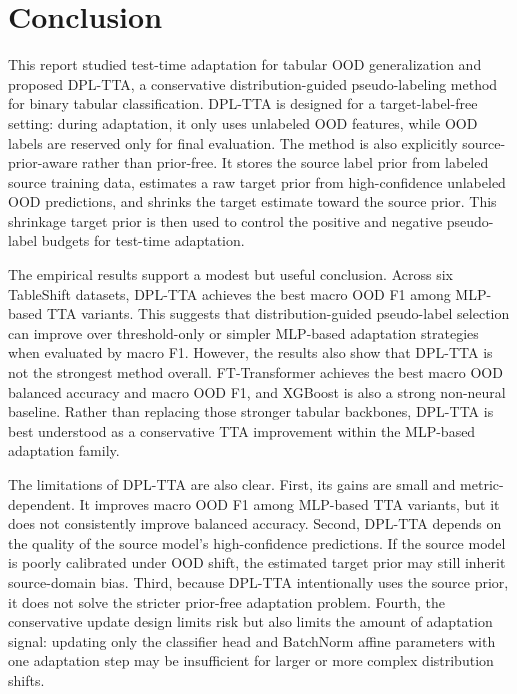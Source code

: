 \documentclass{article}
\begin{document}



\section{Conclusion}

This report studied test-time adaptation for tabular OOD generalization and proposed DPL-TTA, a conservative distribution-guided pseudo-labeling method for binary tabular classification. DPL-TTA is designed for a target-label-free setting: during adaptation, it only uses unlabeled OOD features, while OOD labels are reserved only for final evaluation. The method is also explicitly source-prior-aware rather than prior-free. It stores the source label prior from labeled source training data, estimates a raw target prior from high-confidence unlabeled OOD predictions, and shrinks the target estimate toward the source prior. This shrinkage target prior is then used to control the positive and negative pseudo-label budgets for test-time adaptation.

The empirical results support a modest but useful conclusion. Across six TableShift datasets, DPL-TTA achieves the best macro OOD F1 among MLP-based TTA variants. This suggests that distribution-guided pseudo-label selection can improve over threshold-only or simpler MLP-based adaptation strategies when evaluated by macro F1. However, the results also show that DPL-TTA is not the strongest method overall. FT-Transformer achieves the best macro OOD balanced accuracy and macro OOD F1, and XGBoost is also a strong non-neural baseline. Rather than replacing those stronger tabular backbones, DPL-TTA is best understood as a conservative TTA improvement within the MLP-based adaptation family.

The limitations of DPL-TTA are also clear. First, its gains are small and metric-dependent. It improves macro OOD F1 among MLP-based TTA variants, but it does not consistently improve balanced accuracy. Second, DPL-TTA depends on the quality of the source model's high-confidence predictions. If the source model is poorly calibrated under OOD shift, the estimated target prior may still inherit source-domain bias. Third, because DPL-TTA intentionally uses the source prior, it does not solve the stricter prior-free adaptation problem. Fourth, the conservative update design limits risk but also limits the amount of adaptation signal: updating only the classifier head and BatchNorm affine parameters with one adaptation step may be insufficient for larger or more complex distribution shifts.
\end{document}
